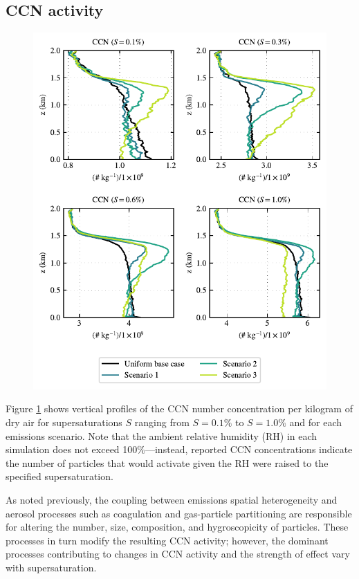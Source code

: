 \documentclass[journal abbreviation, manuscript]{copernicus}
\begin{document}
\subsection{CCN activity}

\begin{figure}[!h]
	\centering
	\includegraphics[]{figures/aerosol-ccn-vertical-profiles-time36.pdf}
	\caption{}
	\label{fig:ccn-vertical-prof}
\end{figure} 

Figure \ref{fig:ccn-vertical-prof} shows vertical profiles of the CCN number concentration per kilogram of dry air for supersaturations $S$ ranging from $S=0.1\%$ to $S=1.0\%$ and for each emissions scenario. Note that the ambient relative humidity (RH) in each simulation does not exceed 100\%---instead, reported CCN concentrations indicate the number of particles that would activate given the RH were raised to the specified supersaturation.

As noted previously, the coupling between emissions spatial heterogeneity and aerosol processes such as coagulation and gas-particle partitioning are responsible for altering the number, size, composition, and hygroscopicity of particles. These processes in turn modify the resulting CCN activity; however, the dominant processes contributing to changes in CCN activity and the strength of effect vary with supersaturation. 
\end{document}
